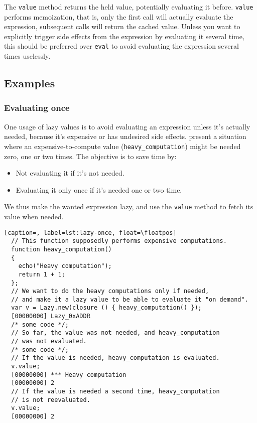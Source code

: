 \documentclass[openright,twoside,12pt]{report}
\begin{document}
The \lstinline|value| method returns the held value, potentially
evaluating it before. \lstinline|value| performs memoization, that is,
only the first call will actually evaluate the expression, subsequent
calls will return the cached value. Unless you want to explicitly
trigger side effects from the expression by evaluating it several
time, this should be preferred over \lstinline|eval| to avoid
evaluating the expression several times uselessly.

\subsection{Examples}

\subsubsection{Evaluating once}

One usage of lazy values is to avoid evaluating an expression unless
it's actually needed, because it's expensive or has undesired side
effects.  present a situation where an
expensive-to-compute value (\lstinline|heavy_computation|) might be
needed zero, one or two times. The objective is to save time by:

\begin{itemize}
\item Not evaluating it if it's not needed.
\item Evaluating it only once if it's needed one or two time.
\end{itemize}

We thus make the wanted expression lazy, and use the \lstinline|value|
method to fetch its value when needed.

\begin{lstlisting}[caption=, label=lst:lazy-once, float=\floatpos]
  // This function supposedly performs expensive computations.
  function heavy_computation()
  {
    echo("Heavy computation");
    return 1 + 1;
  };
  // We want to do the heavy computations only if needed,
  // and make it a lazy value to be able to evaluate it "on demand".
  var v = Lazy.new(closure () { heavy_computation() });
  [00000000] Lazy_0xADDR
  /* some code */;
  // So far, the value was not needed, and heavy_computation
  // was not evaluated.
  /* some code */;
  // If the value is needed, heavy_computation is evaluated.
  v.value;
  [00000000] *** Heavy computation
  [00000000] 2
  // If the value is needed a second time, heavy_computation
  // is not reevaluated.
  v.value;
  [00000000] 2
\end{lstlisting}
\end{document}
